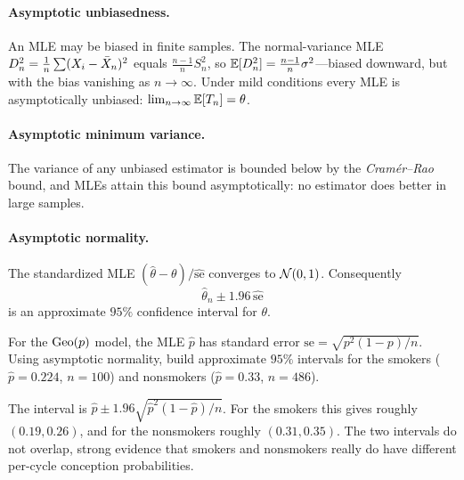 \paragraph{Asymptotic unbiasedness.} An MLE may be biased in finite samples. The
normal-variance MLE $D_n^2=\tfrac1n\sum(X_i-\bar{X}_n)^2$ equals
$\tfrac{n-1}{n}S_n^2$, so $\mathbb{E}[D_n^2]=\tfrac{n-1}{n}\sigma^2$—biased downward, but
with the bias vanishing as $n\to\infty$. Under mild conditions every MLE is
asymptotically unbiased: $\lim_{n\to\infty}\mathbb{E}[T_n]=\theta$.

\paragraph{Asymptotic minimum variance.} The variance of any unbiased estimator
is bounded below by the \emph{Cram\'er--Rao} bound, and MLEs attain this bound
asymptotically: no estimator does better in large samples.

\paragraph{Asymptotic normality.} The standardized MLE
$(\hat\theta-\theta)/\widehat{\mathrm{se}}$ converges to $\mathcal{N}(0,1)$. Consequently
\[
  \hat\theta_n\pm 1.96\,\widehat{\mathrm{se}}
\]
is an approximate $95\%$ confidence interval for $\theta$.

\begin{example}
For the $\mathrm{Geo}(p)$ model, the MLE $\hat p$ has standard error
$\mathrm{se}=\sqrt{p^2(1-p)/n}$. Using asymptotic normality, build approximate
$95\%$ intervals for the smokers ($\hat p=0.224$, $n=100$) and nonsmokers
($\hat p=0.33$, $n=486$).

\solution The interval is $\hat p\pm 1.96\sqrt{\hat p^2(1-\hat p)/n}$. For the
smokers this gives roughly $(0.19,0.26)$, and for the nonsmokers roughly
$(0.31,0.35)$. The two intervals do not overlap, strong evidence that smokers and
nonsmokers really do have different per-cycle conception probabilities.
\end{example}
